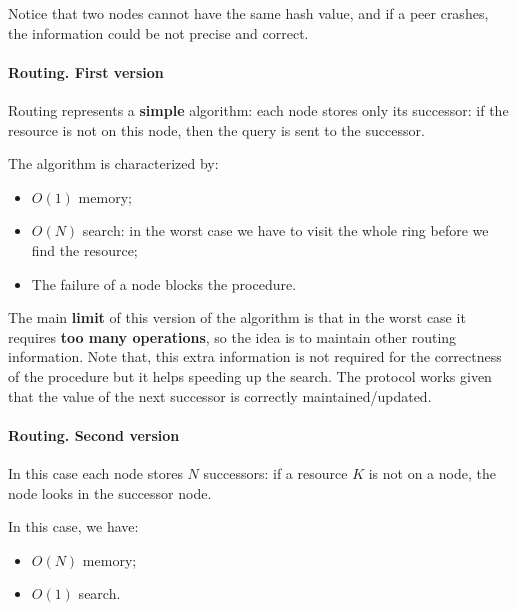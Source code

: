 
Notice that two nodes cannot have the same hash value, and if a peer crashes, the information could be not precise and correct.


\paragraph{Routing. First version} Routing represents a \textbf{simple} algorithm: each node stores only its successor: if the resource is not on this node, then the query is sent to the successor.

The algorithm is characterized by:
\begin{itemize}
    \item $O(1)$ memory;
    \item $O(N)$ search: in the worst case we have to visit the whole ring before we find the resource;
    \item The failure of a node blocks the procedure.
\end{itemize}


The main \textbf{limit} of this version of the algorithm is that in the worst case it requires \textbf{too many operations}, so the idea is to maintain other routing information. Note that, this extra information is not required for the correctness of the procedure but it helps speeding up the search. The protocol works given that the value of the next successor is correctly maintained/updated.

\paragraph{Routing. Second version} In this case each node stores $N$ successors: if a resource $K$ is not on a node, the node looks in the successor node.

In this case, we have:
\begin{itemize}
    \item $O(N)$ memory;
    \item $O(1)$ search.
\end{itemize}

